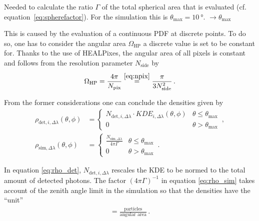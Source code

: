 Needed to calculate the ratio $\Gamma$ of the total spherical area that is evaluated (cf. equation~\eqref{eq:spherefactor}). For the \iceact simulation this is $\theta_\text{max} = \SI{10}{\degree}$. $\rightarrow \theta_\text{max}$

This is caused by the evaluation of a continuous PDF at discrete points. To do so, one has to consider the angular area $\Omega_\text{HP}$ a discrete value is set to be constant for. Thanks to the use of HEALPixes, the angular area of all pixels is constant and follows from the resolution parameter $N_\text{side}$ by
\begin{align}
	\Omega_\text{HP} = \frac{4\pi}{N_\text{pix}} \overset{\eqref{eq:npix}}{=} \frac{\pi}{3N_\text{side}^2}\,.
	\label{eq:omega_hp}
\end{align}

From the former considerations one can conclude the densities given by
\begin{subequations}
	\begin{align}
		\rho_{\text{det},i,\Delta\lambda}(\theta,\phi) &= 
		\begin{cases}
			N_{\text{det},i,\Delta\lambda}\cdot KDE_{i,\Delta\lambda}(\theta,\phi) & \theta\leq\theta_\text{max}\\
			0 & \theta > \theta_\text{max}
		\end{cases}\,,
		\label{eq:rho_det}
		\\
		\rho_{\text{sim},\Delta\lambda}(\theta,\phi) &= 
		\begin{cases}
			\frac{N_{\text{sim},\Delta\lambda}}{4\pi\Gamma} & \theta\leq\theta_\text{max}\\
			0 & \theta > \theta_\text{max}
		\end{cases}\,.
		\label{eq:rho_sim}
	\end{align}
\end{subequations}

In equation \eqref{eq:rho_det}, $N_{\text{det},i,\Delta\lambda}$ rescales the KDE to be normed to the total amount of detected photons. The factor $(4\pi\Gamma)^{-1}$ in equation \eqref{eq:rho_sim} takes account of the zenith angle limit in the simulation so that the densities have the \enquote{unit}
\begin{align}
	[\rho] = \frac{\text{particles}}{\text{angular area}}\,.
\end{align}

